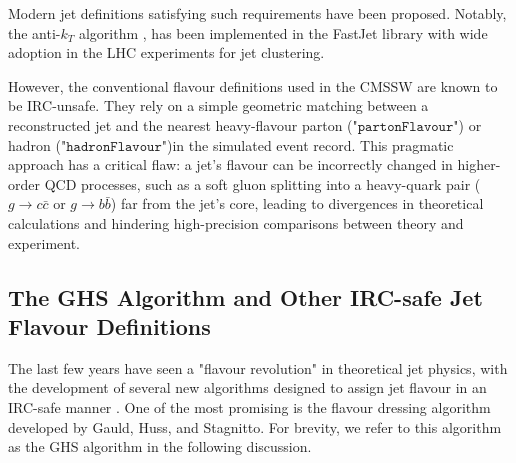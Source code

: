\documentclass[10pt,twocolumn]{article}
\newcommand*{\parFlav}{\texttt{partonFlavour}}
\newcommand*{\hadFlav}{\texttt{hadronFlavour}}
\begin{document}
Modern jet definitions satisfying such requirements have been proposed. Notably, the anti-$k_T$ algorithm \cite{ANTIKT_2008}, has been implemented in the FastJet library \cite{FASTJET_EPJC_2012} with wide adoption in the LHC experiments for jet clustering.

However, the conventional flavour definitions used in the CMSSW are known to be IRC-unsafe. They rely on a simple geometric matching between a reconstructed jet and the nearest heavy-flavour parton ("$\parFlav$") or hadron ("$\hadFlav$")in the simulated event record. This pragmatic approach has a critical flaw: a jet's flavour can be incorrectly changed in higher-order QCD processes, such as a soft gluon splitting into a heavy-quark pair ($g \rightarrow c\bar{c}$ or $g \rightarrow b\bar{b}$) far from the jet's core, leading to divergences in theoretical calculations and hindering high-precision comparisons between theory and experiment.

\subsection{The GHS Algorithm and Other IRC-safe Jet Flavour Definitions}
\label{sec:intro-ghs}

The last few years have seen a "flavour revolution" in theoretical jet physics, with the development of several new algorithms designed to assign jet flavour in an IRC-safe manner \cite{JETFLAVALGO_COMP_2005}. One of the most promising is the flavour dressing algorithm \cite{GHS_V2_2024} developed by Gauld, Huss, and Stagnitto. For brevity, we refer to this algorithm as the GHS algorithm in the following discussion.
\end{document}
